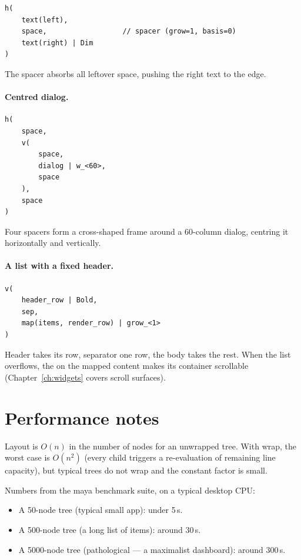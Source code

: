 \begin{lstlisting}
h(
    text(left),
    space,                  // spacer (grow=1, basis=0)
    text(right) | Dim
)
\end{lstlisting}

The spacer absorbs all leftover space, pushing the right text to
the edge.

\paragraph{Centred dialog.}

\begin{lstlisting}
h(
    space,
    v(
        space,
        dialog | w_<60>,
        space
    ),
    space
)
\end{lstlisting}

Four spacers form a cross-shaped frame around a 60-column dialog,
centring it horizontally and vertically.

\paragraph{A list with a fixed header.}

\begin{lstlisting}
v(
    header_row | Bold,
    sep,
    map(items, render_row) | grow_<1>
)
\end{lstlisting}

Header takes its row, separator one row, the body takes the rest.
When the list overflows, the  on the mapped
content makes its container scrollable (Chapter~\ref{ch:widgets}
covers scroll surfaces).

\section{Performance notes}
\label{sec:layout:perf}

Layout is $O(n)$ in the number of nodes for an unwrapped tree.
With wrap, the worst case is $O(n^2)$ (every child triggers a
re-evaluation of remaining line capacity), but typical trees do
not wrap and the constant factor is small.

Numbers from the maya benchmark suite, on a typical desktop CPU:

\begin{itemize}[leftmargin=*]
  \item A 50-node tree (typical small app): under 5\,\textmu{}s.
  \item A 500-node tree (a long list of items): around
    30\,\textmu{}s.
  \item A 5000-node tree (pathological --- a maximalist
    dashboard): around 300\,\textmu{}s.
\end{itemize}

